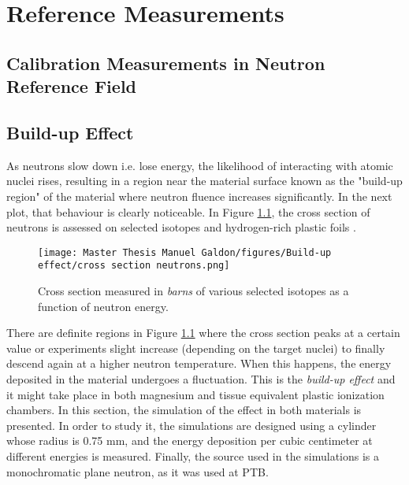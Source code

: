 \chapter{Reference Measurements}

\section{Calibration Measurements in Neutron Reference Field}



\section{Build-up Effect}
As neutrons slow down i.e. lose energy, the likelihood of interacting with atomic nuclei rises, resulting in a region near the material surface known as the "build-up region" of the material where neutron fluence increases significantly. In the next plot, that behaviour is clearly noticeable. In Figure \ref{fig:Cross seciton neutrons}, the cross section of neutrons is assessed on selected isotopes and hydrogen-rich plastic foils \cite{NeutronImaging}.

\begin{figure}[!h]
\centering
\begin{minipage}{0.9\textwidth}
    \centering
    \texttt{[image: Master Thesis Manuel Galdon/figures/Build-up effect/cross section neutrons.png]} 
    \caption{Cross section measured in  \textit{barns} of various selected isotopes as a function of neutron energy. }
    \label{fig:Cross seciton neutrons}
\end{minipage}
\end{figure}

There are definite regions in Figure \ref{fig:Cross seciton neutrons} where the cross section peaks at a certain value or experiments slight increase (depending on the target nuclei) to finally descend again at a higher neutron temperature. When this happens, the energy deposited in the material undergoes a fluctuation. This is the \textit{build-up effect} and it might take place in both magnesium and tissue equivalent plastic ionization chambers. In this section, the simulation of the effect in both materials is presented. In order to study it, the simulations are designed using a cylinder whose radius is 0.75 \unit{\milli\meter}, and the energy deposition per cubic centimeter at different energies is measured. Finally, the source used in the simulations is a monochromatic plane neutron, as it was used at PTB.

